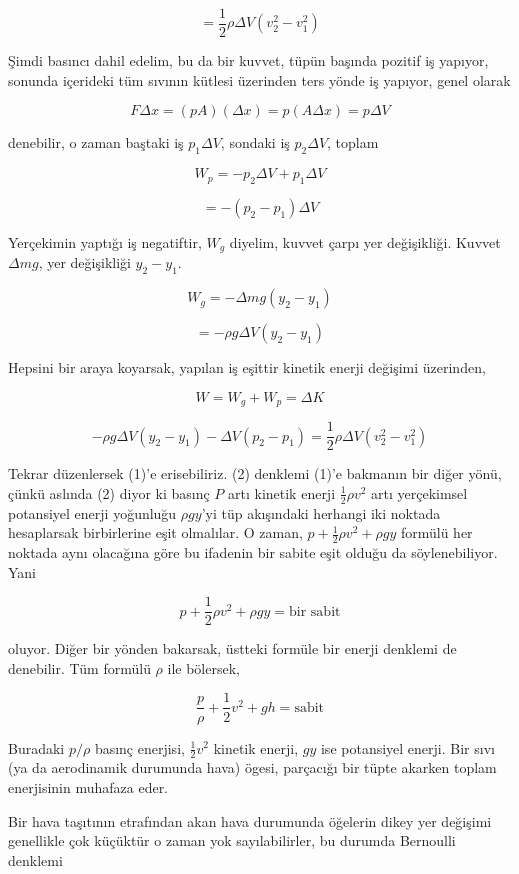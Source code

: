 \documentclass[12pt,fleqn]{article}\usepackage{../../common}
\begin{document}
$$
= \frac{1}{2} \rho \Delta V(v_2^2 - v_1^2)
$$

Şimdi basıncı dahil edelim, bu da bir kuvvet, tüpün başında pozitif iş
yapıyor, sonunda içerideki tüm sıvının kütlesi üzerinden ters yönde iş
yapıyor, genel olarak 

$$
F \Delta x  = (pA)(\Delta x) = p(A\Delta x) = p \Delta V
$$

denebilir, o zaman baştaki iş $p_1 \Delta V$, sondaki iş $p_2 \Delta V$,
toplam

$$
W_p = -p_2 \Delta V + p_1 \Delta V
$$

$$
= - (p_2-p_1) \Delta V
$$

Yerçekimin yaptığı iş negatiftir, $W_g$ diyelim, kuvvet çarpı yer
değişikliği. Kuvvet $\Delta m g$, yer değişikliği $y_2-y_1$. 

$$
W_g = -\Delta m g (y_2 - y_1)
$$

$$
= -\rho g \Delta V (y_2-y_1)
$$


Hepsini bir araya koyarsak, yapılan iş eşittir kinetik enerji değişimi
üzerinden,

$$
W = W_g + W_p = \Delta K
$$

$$
-\rho g \Delta V(y_2-y_1) - \Delta V(p_2-p_1) = 
\frac{1}{2} \rho \Delta V(v_2^2 - v_1^2)
$$

Tekrar düzenlersek (1)'e erisebiliriz. (2) denklemi (1)'e bakmanın bir
diğer yönü, çünkü aslında (2) diyor ki basınç $P$ artı kinetik enerji
$\frac{1}{2} \rho v^2$ artı yerçekimsel potansiyel enerji yoğunluğu
$\rho g y$'yi tüp akışındaki herhangi iki noktada hesaplarsak birbirlerine
eşit olmalılar. O zaman, $p + \frac{1}{2} \rho v^2 + \rho g y$ formülü her
noktada aynı olacağına göre bu ifadenin bir sabite eşit olduğu da
söylenebiliyor. Yani

$$
p + \frac{1}{2} \rho v^2 + \rho g y = \textrm{bir sabit}
$$

oluyor. Diğer bir yönden bakarsak, üstteki formüle bir enerji denklemi de
denebilir. Tüm formülü $\rho$ ile bölersek,

$$
\frac{p}{\rho} + \frac{1}{2} v^2 + gh = \textrm{sabit}
$$

Buradaki $p / \rho$ basınç enerjisi, $\frac{1}{2}v^2$ kinetik enerji, $gy$ ise
potansiyel enerji. Bir sıvı (ya da aerodinamik durumunda hava) ögesi, parçacığı
bir tüpte akarken toplam enerjisinin muhafaza eder.

Bir hava taşıtının etrafından akan hava durumunda öğelerin dikey yer
değişimi genellikle çok küçüktür o zaman yok sayılabilirler, bu durumda
Bernoulli denklemi 
\end{document}
